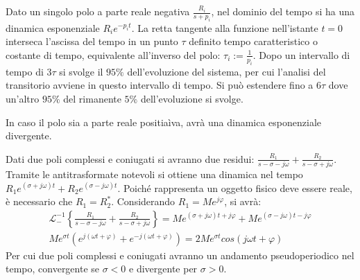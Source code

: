 \documentclass{article}
\numberwithin{equation}{subsection}
\begin{document}
Dato un singolo polo a parte reale negativa $\displaystyle\frac{R_i}{s+p_i}$, nel dominio del tempo si ha una dinamica esponenziale $R_ie^{-p_it}$. La retta tangente alla funzione 
nell'istante $t=0$ interseca l'ascissa del tempo in un punto $\tau$ definito tempo 
caratteristico o costante di tempo, equivalente all'inverso del polo: $\tau_i:=\displaystyle\frac{1}{p_i}$. Dopo un intervallo di tempo di $3\tau$ si svolge il $95\%$ dell'evoluzione 
del sistema, per cui l'analisi del transitorio avviene in questo intervallo di tempo. Si può estendere fino a $6\tau$ dove un'altro $95\%$ del rimanente $5\%$ dell'evoluzione 
si svolge. 
\begin{center}
\end{center}

In caso il polo sia a parte reale positiaìva, avrà una dinamica esponenziale divergente.

Dati due poli complessi e coniugati si avranno due residui: $\displaystyle\frac{R_1}{s-\sigma-j\omega}+\frac{R_2}{s-\sigma+j\omega}$. Tramite le antitrasformate notevoli si 
ottiene una dinamica nel tempo $R_1e^{(\sigma+j\omega)t}+R_2e^{(\sigma-j\omega)t}$. Poiché rappresenta un oggetto fisico deve essere reale, è necessario che $R_1=R^*_2$. 
Considerando $R_1=Me^{j\varphi}$, si avrà:
\begin{gather}
    \mathscr{L}_-^{-1}\left\{\displaystyle\frac{R_1}{s-\sigma-j\omega}+\frac{R_2}{s-\sigma+j\omega}\right\}=Me^{(\sigma+j\omega)t+j\varphi}+Me^{(\sigma-j\omega)t-j\varphi}\\
    Me^{\sigma t}\left(e^{j(\omega t+\varphi)}+e^{-j(\omega t+\varphi)}\right)=2Me^{\sigma t}cos(j\omega t+\varphi)
\end{gather}
Per cui due poli complessi e coniugati avranno un andamento pseudoperiodico nel tempo, convergente se $\sigma<0$ e divergente per $\sigma>0$.  
\begin{center}
\end{center}
\end{document}
